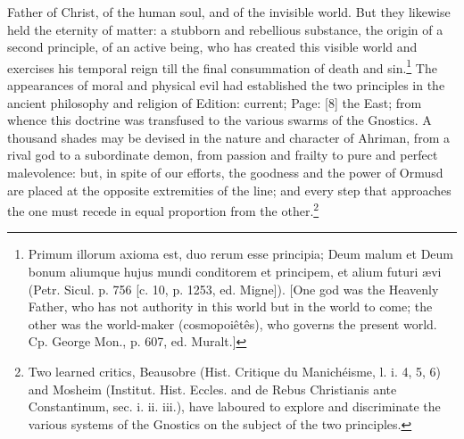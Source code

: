 Father of Christ, of the human soul, and of the invisible world. But they likewise held the eternity of matter: a stubborn and rebellious substance, the origin of a second principle, of an active being, who has created this visible world and exercises his temporal reign till the final consummation of death and sin.\footnote{Primum illorum axioma est, duo rerum esse principia; Deum malum et Deum bonum aliumque hujus mundi conditorem et principem, et alium futuri ævi (Petr. Sicul. p. 756 [c. 10, p. 1253, ed. Migne]). [One god was the Heavenly Father, who has not authority in this world but in the world to come; the other was the world-maker (cosmopoiêtês), who governs the present world. Cp. George Mon., p. 607, ed. Muralt.]} The appearances of moral and physical evil had established the two principles in the ancient philosophy and religion of Edition: current; Page: [8] the East; from whence this doctrine was transfused to the various swarms of the Gnostics. A thousand shades may be devised in the nature and character of Ahriman, from a rival god to a subordinate demon, from passion and frailty to pure and perfect malevolence: but, in spite of our efforts, the goodness and the power of Ormusd are placed at the opposite extremities of the line; and every step that approaches the one must recede in equal proportion from the other.\footnote{Two learned critics, Beausobre (Hist. Critique du Manichéisme, l. i. 4, 5, 6) and Mosheim (Institut. Hist. Eccles. and de Rebus Christianis ante Constantinum, sec. i. ii. iii.), have laboured to explore and discriminate the various systems of the Gnostics on the subject of the two principles.}

